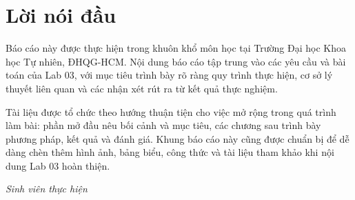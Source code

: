 \chapter*{Lời nói đầu}

Báo cáo này được thực hiện trong khuôn khổ môn học \coursename{} tại Trường Đại học Khoa học Tự nhiên, ĐHQG-HCM. Nội dung báo cáo tập trung vào các yêu cầu và bài toán của Lab 03, với mục tiêu trình bày rõ ràng quy trình thực hiện, cơ sở lý thuyết liên quan và các nhận xét rút ra từ kết quả thực nghiệm.

Tài liệu được tổ chức theo hướng thuận tiện cho việc mở rộng trong quá trình làm bài: phần mở đầu nêu bối cảnh và mục tiêu, các chương sau trình bày phương pháp, kết quả và đánh giá. Khung báo cáo này cũng được chuẩn bị để dễ dàng chèn thêm hình ảnh, bảng biểu, công thức và tài liệu tham khảo khi nội dung Lab 03 hoàn thiện.

\vspace{1cm}

\begin{flushright}
\textit{Sinh viên thực hiện}\\
\textit{\studentname}
\end{flushright}

\clearpage
